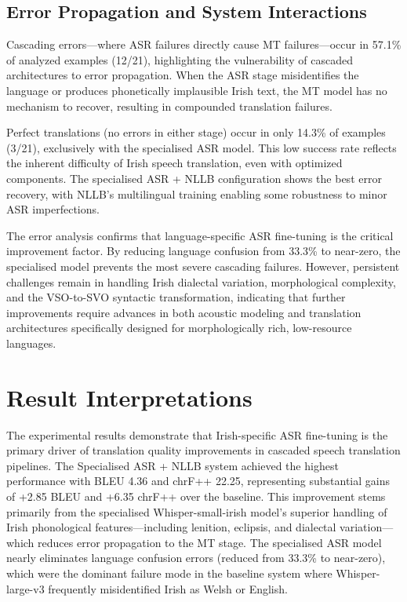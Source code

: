 \documentclass[11pt]{article}
\begin{document}
\subsection{Error Propagation and System Interactions}

Cascading errors—where ASR failures directly cause MT failures—occur in 57.1\% of analyzed examples (12/21), highlighting the vulnerability of cascaded architectures to error propagation. When the ASR stage misidentifies the language or produces phonetically implausible Irish text, the MT model has no mechanism to recover, resulting in compounded translation failures.

Perfect translations (no errors in either stage) occur in only 14.3\% of examples (3/21), exclusively with the specialised ASR model. This low success rate reflects the inherent difficulty of Irish speech translation, even with optimized components. The specialised ASR + NLLB configuration shows the best error recovery, with NLLB's multilingual training enabling some robustness to minor ASR imperfections.

The error analysis confirms that language-specific ASR fine-tuning is the critical improvement factor. By reducing language confusion from 33.3\% to near-zero, the specialised model prevents the most severe cascading failures. However, persistent challenges remain in handling Irish dialectal variation, morphological complexity, and the VSO-to-SVO syntactic transformation, indicating that further improvements require advances in both acoustic modeling and translation architectures specifically designed for morphologically rich, low-resource languages.

\section{Result Interpretations}

The experimental results demonstrate that Irish-specific ASR fine-tuning is the primary driver of translation quality improvements in cascaded speech translation pipelines. The Specialised ASR + NLLB system achieved the highest performance with BLEU 4.36 and chrF++ 22.25, representing substantial gains of +2.85 BLEU and +6.35 chrF++ over the baseline. This improvement stems primarily from the specialised Whisper-small-irish model's superior handling of Irish phonological features—including lenition, eclipsis, and dialectal variation—which reduces error propagation to the MT stage. The specialised ASR model nearly eliminates language confusion errors (reduced from 33.3\% to near-zero), which were the dominant failure mode in the baseline system where Whisper-large-v3 frequently misidentified Irish as Welsh or English.
\end{document}
